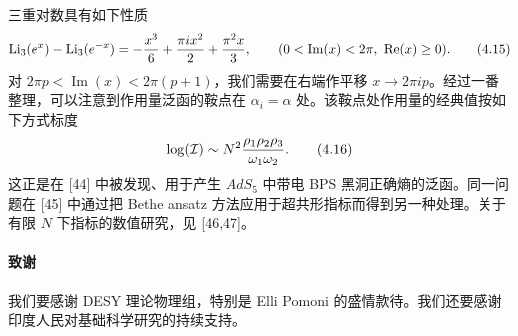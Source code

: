 三重对数具有如下性质
\[
\Li_3(e^x)-\Li_3(e^{-x})=-\frac{x^3}{6}+\frac{\pi i x^2}{2}+\frac{\pi^2 x}{3},\qquad (0<\operatorname{Im}(x)<2\pi,\ \operatorname{Re}(x)\ge0) .
\tag{4.15}
\]
对 $2\pi p<\operatorname{Im}(x)<2\pi(p+1)$，我们需要在右端作平移 $x\to2\pi ip$。经过一番整理，可以注意到作用量泛函的鞍点在 $\alpha_i=\alpha$ 处。该鞍点处作用量的经典值按如下方式标度
\[
\log(\mathcal{I})\sim N^2\frac{\rho_1\rho_2\rho_3}{\omega_1\omega_2} .
\tag{4.16}
\]
这正是在 [44] 中被发现、用于产生 $AdS_5$ 中带电 BPS 黑洞正确熵的泛函。同一问题在 [45] 中通过把 Bethe ansatz 方法应用于超共形指标而得到另一种处理。关于有限 $N$ 下指标的数值研究，见 [46,47]。
\paragraph{致谢}
我们要感谢 DESY 理论物理组，特别是 Elli Pomoni 的盛情款待。我们还要感谢印度人民对基础科学研究的持续支持。

